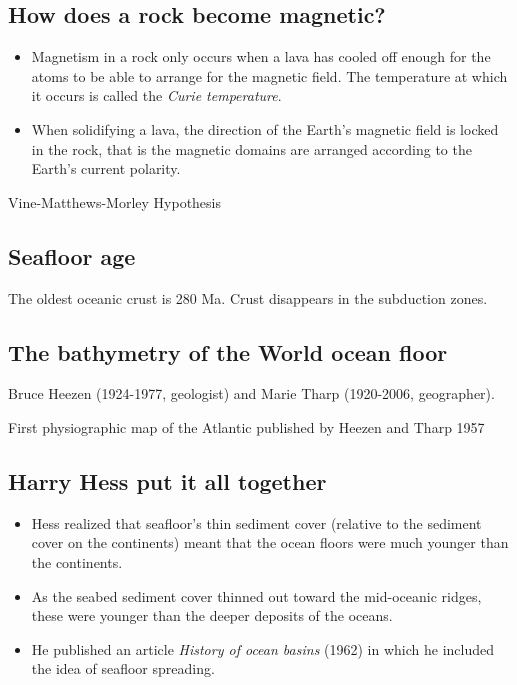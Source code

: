 \subsection{How does a rock become magnetic?}

\begin{itemize}
    \item Magnetism in a rock only occurs when a lava has cooled off enough for
        the atoms to be able to arrange for the magnetic field. The temperature
        at which it occurs is called the \textit{Curie temperature}.
    \item When solidifying a lava, the direction of the Earth's magnetic field
        is locked in the rock, that is the magnetic domains are arranged
        according to the Earth's current polarity.
\end{itemize}

Vine-Matthews-Morley Hypothesis

\subsection{Seafloor age}

The oldest oceanic crust is 280 Ma. Crust disappears in the subduction zones.

\subsection{The bathymetry of the World ocean floor}

Bruce Heezen (1924-1977, geologist) and Marie Tharp (1920-2006, geographer).

First physiographic map of the Atlantic published by Heezen and Tharp 1957

\subsection{Harry Hess put it all together}

\begin{itemize}
    \item Hess realized that seafloor's thin sediment cover (relative to the
        sediment cover on the continents) meant that the ocean floors were
        much younger than the continents.
    \item As the seabed sediment cover thinned out toward the mid-oceanic
        ridges, these were younger than the deeper deposits of the oceans.
    \item He published an article \textit{History of ocean basins} (1962)
        in which he included the idea of seafloor spreading.
\end{itemize}

